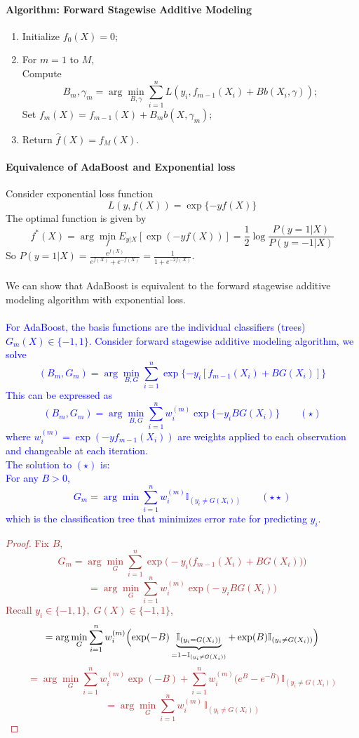 \documentclass[12pt]{book}
\theoremstyle{definition}
\theoremstyle{remark}
\begin{document}
\paragraph{Algorithm: Forward Stagewise Additive Modeling}
\begin{enumerate}
    \item Initialize $f_0(X) = 0$;
    \item For $m = 1$ to $M$, \\
    Compute 
    \[B_m, \gamma_m = \arg\underset{B, \gamma}{\min}\sum_{i=1}^n L(y_i, f_{m-1}(X_i)+Bb(X_i,\gamma));\]
    Set $f_m(X) = f_{m-1}(X)+B_mb(X, \gamma_m)$;
    \item Return $\hat{f}(X) = f_M(X)$.
\end{enumerate}


\paragraph{Equivalence of AdaBoost and Exponential loss}
Consider exponential loss function \[L(y, f(X)) = \exp\{-yf(X)\}\]
The optimal function is given by
\[f^*(X) = \arg\underset{f}{\min} E_{y|X}[\exp(-yf(X))] = \frac12 \log \frac{P(y=1|X)}{P(y = -1|X)}\]
So $P(y=1|X) = \frac{e^{f(X)}}{e^{f(X)}+e^{-f(X)}} = \frac 1{1+e^{-2f(X)}}$.\\
\\
We can show that AdaBoost is equivalent to the forward stagewise additive modeling algorithm with exponential loss.\\
\\
\textcolor{blue}{
For AdaBoost, the basis functions are the individual classifiers (trees) $G_m(X) \in \{-1, 1\}$. Consider forward stagewise additive modeling algorithm, we solve
\[(B_m, G_m) = \arg\underset{B,G}{\min}\sum_{i=1}^n\exp\{-y_i[f_{m-1}(X_i)+BG(X_i)]\}\]
This can be expressed as 
\[(B_m, G_m) = \arg\underset{B,G}{\min}\sum_{i=1}^nw_i^{(m)}\exp\{-y_iBG(X_i)\} \quad \quad (\star)\]
where $w_i^{(m)} = \exp (-yf_{m-1}(X_i))$ are weights applied to each observation and changeable at each iteration.\\
The solution to $(\star)$ is:\\
For any $B >0$, 
\[G_m = \arg\min \sum_{i=1}^n w_i^{(m)} \mathbb{I}_{(y_i \ne G(X_i))}\quad \quad (\star\star)\]
which is the classification tree that minimizes error rate for predicting $y_i$.\\}
\textcolor{brown}{
\begin{proof}
    Fix $B$, 
\[G_m = \arg\min_{G}\sum_{i=1}^n\exp\bigl(-y_i\bigl(f_{m-1}(X_i)+ BG(X_i)\bigr)\bigr)\]
\[= \arg\min_G\sum_{i=1}^n w_i^{(m)}\exp\bigl(-y_iBG(X_i)\bigr)\]
Recall $y_i\in\{-1,1\},\;G(X)\in\{-1,1\}$,
\[
= \arg\min_G\sum_{i=1}^n w_i^{(m)}\Bigl(\exp(-B)\underbrace{\mathbb{I}_{(y_i= G(X_i))}}_{=1 - \mathbb{I}_{(y_i\ne G(X_i))}}+\exp(B)\mathbb{I}_{(y_i\ne G(X_i))}\Bigr)
\]
\[= \arg\min_G\sum_{i=1}^n w_i^{(m)}\exp(-B)+\sum_{i=1}^n w_i^{(m)}\bigl(e^B - e^{-B}\bigr)\,\mathbb{I}_{(y_i\ne G(X_i))}\]
\[= \arg\min_G\sum_{i=1}^n w_i^{(m)}\,\mathbb{I}_{(y_i\ne G(X_i))}\]
\end{proof}
}
\end{document}
